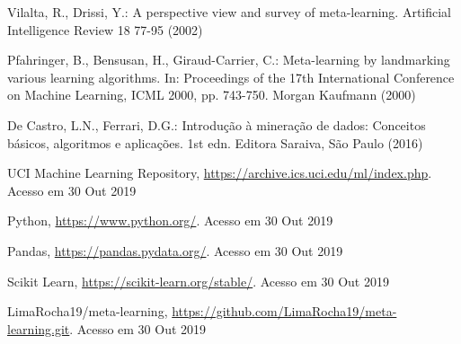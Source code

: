 \documentclass[runningheads]{llncs}
\begin{document}
\begin{thebibliography}{8}
Vilalta, R., Drissi, Y.: A perspective view and survey of meta-learning. Artificial Intelligence Review 18 77-95 (2002)

Pfahringer, B., Bensusan, H., Giraud-Carrier, C.: Meta-learning by landmarking various learning algorithms. In: Proceedings of the 17th International Conference on Machine Learning, ICML 2000, pp. 743-750. Morgan Kaufmann (2000)

De Castro, L.N., Ferrari, D.G.: Introdução à mineração de dados: Conceitos básicos, algoritmos e aplicações. 1st edn. Editora Saraiva, São Paulo (2016)

UCI Machine Learning Repository, \url{https://archive.ics.uci.edu/ml/index.php}. Acesso em 30 Out 2019

Python, \url{https://www.python.org/}. Acesso em 30 Out 2019

Pandas, \url{https://pandas.pydata.org/}. Acesso em 30 Out 2019

Scikit Learn, \url{https://scikit-learn.org/stable/}. Acesso em 30 Out 2019

LimaRocha19/meta-learning, \url{https://github.com/LimaRocha19/meta-learning.git}. Acesso em 30 Out 2019

\end{thebibliography}
\end{document}
